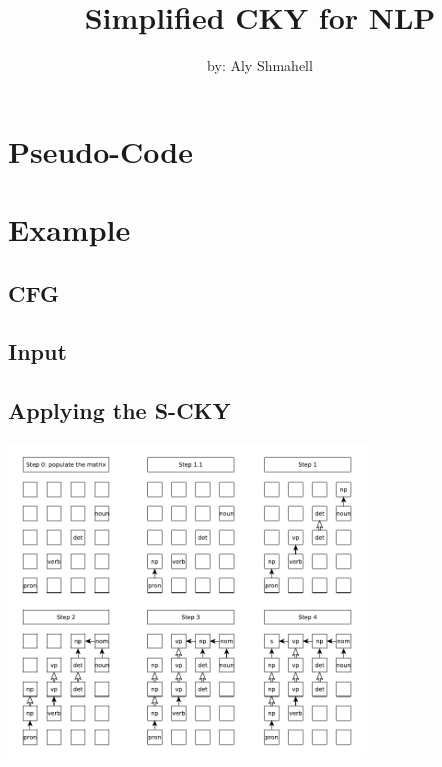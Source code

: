 \documentclass[9pt]{extarticle}
\title{Simplified CKY for NLP}
\author{by: Aly Shmahell}
\begin{document}
	\maketitle
	\makeindex
	\begin{multicols*}{3}
		\setlength{\parskip}{0.0in}
		\tableofcontents
		\setlength{\parskip}{0.1in}
		\section{Pseudo-Code}
			
		\section{Example}
			\subsection{CFG}
				
			\subsection{Input}
				
			\subsection{Applying the S-CKY}
				\includegraphics[width=95mm]{example.pdf}	
    \end{multicols*}
\end{document}

